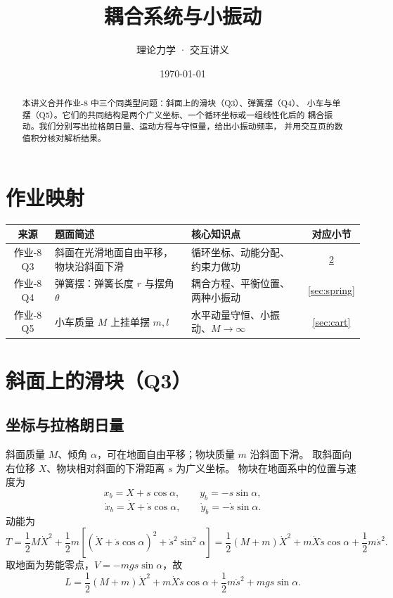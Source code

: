 \documentclass[UTF8,a4paper,11pt]{ctexart}
\title{\textbf{耦合系统与小振动}}
\author{理论力学 · 交互讲义}
\date{\today}
\begin{document}
\maketitle

\begin{abstract}
本讲义合并作业-8 中三个同类型问题：斜面上的滑块（Q3）、弹簧摆（Q4）、
小车与单摆（Q5）。它们的共同结构是两个广义坐标、一个循环坐标或一组线性化后的
耦合振动。我们分别写出拉格朗日量、运动方程与守恒量，给出小振动频率，
并用交互页的数值积分核对解析结果。
\end{abstract}

\tableofcontents
\newpage

\section{作业映射}

\begin{center}
\small
\begin{tabular}{cp{5.9cm}p{3.2cm}c}
\toprule
来源 & 题面简述 & 核心知识点 & 对应小节 \\
\midrule
作业-8 Q3 & 斜面在光滑地面自由平移，物块沿斜面下滑 &
  循环坐标、动能分配、约束力做功 & \ref{sec:wedge} \\
作业-8 Q4 & 弹簧摆：弹簧长度 $r$ 与摆角 $\theta$ &
  耦合方程、平衡位置、两种小振动 & \ref{sec:spring} \\
作业-8 Q5 & 小车质量 $M$ 上挂单摆 $m,l$ &
  水平动量守恒、小振动、$M\to\infty$ & \ref{sec:cart} \\
\bottomrule
\end{tabular}
\end{center}

\section{斜面上的滑块（Q3）}\label{sec:wedge}

\subsection{坐标与拉格朗日量}

斜面质量 $M$、倾角 $\alpha$，可在地面自由平移；物块质量 $m$ 沿斜面下滑。
取斜面向右位移 $X$、物块相对斜面的下滑距离 $s$ 为广义坐标。
物块在地面系中的位置与速度为
\begin{equation}
  x_b=X+s\cos\alpha,\qquad y_b=-s\sin\alpha,
  \label{eq:w-pos}
\end{equation}
\begin{equation}
  \dot x_b=\dot X+\dot s\cos\alpha,\qquad \dot y_b=-\dot s\sin\alpha.
  \label{eq:w-vel}
\end{equation}
动能为
\begin{equation}
  T=\frac12M\dot X^2+\frac12m\left[(\dot X+\dot s\cos\alpha)^2+\dot s^2\sin^2\alpha\right]
   =\frac12(M+m)\dot X^2+m\dot X\dot s\cos\alpha+\frac12m\dot s^2 .
  \label{eq:w-T}
\end{equation}
取地面为势能零点，$V=-mgs\sin\alpha$，故
\begin{equation}
  L=\frac12(M+m)\dot X^2+m\dot X\dot s\cos\alpha+\frac12m\dot s^2+mgs\sin\alpha .
  \label{eq:w-L}
\end{equation}
\end{document}
